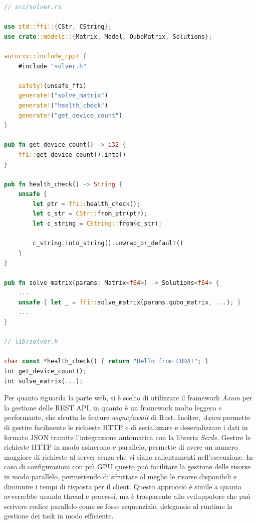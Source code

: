 \newpage
\vspace{5mm}
\begin{lstlisting}[language=Rust, caption=Macro autocxx e uso della FFI, label=lis:generic_glsl]
// src/solver.rs

use std::ffi::{CStr, CString};
use crate::models::{Matrix, Model, QuboMatrix, Solutions};

autocxx::include_cpp! {
    #include "solver.h"

    safety!(unsafe_ffi)
    generate!("solve_matrix")
    generate!("health_check")
    generate!("get_device_count")
}

pub fn get_device_count() -> i32 {
    ffi::get_device_count().into()
}

pub fn health_check() -> String {
    unsafe {
        let ptr = ffi::health_check();
        let c_str = CStr::from_ptr(ptr);
        let c_string = CString::from(c_str);

        c_string.into_string().unwrap_or_default()
    }
}

pub fn solve_matrix(params: Matrix<f64>) -> Solutions<f64> {
    ...
    unsafe { let _ = ffi::solve_matrix(params.qubo_matrix, ...); }
    ...
}

// lib/solver.h

char const *health_check() { return "Hello from CUDA!"; }
int get_device_count();
int solve_matrix(...);
\end{lstlisting}
\vspace{5mm}


Per quanto riguarda la parte web, si è scelto di utilizzare il framework \textit{Axum} per la gestione delle REST \gls{API}, in quanto è un framework molto leggero e performante, che sfrutta le feature \textit{async/await} di Rust. Inoltre, \textit{Axum} permette di gestire facilmente le richieste \gls{HTTP} e di serializzare e deserializzare i dati in formato \gls{JSON} tramite l'integrazione automatica con la libreria \textit{Serde}. Gestire le richieste \gls{HTTP} in modo asincrono e parallelo, permette di avere un numero maggiore di richieste al server senza che vi siano rallentamenti nell'esecuzione. In caso di configurazioni con più \gls{GPU} questo può facilitare la gestione delle risorse in modo parallelo, permettendo di sfruttare al meglio le risorse disponibili e diminuire i tempi di risposta per il client. Questo approccio è simile a quanto avverrebbe usando thread e processi, ma è trasparente allo sviluppatore che può scrivere codice parallelo come se fosse sequenziale, delegando al runtime la gestione dei task in modo efficiente.

